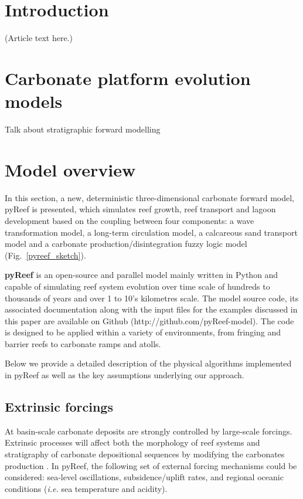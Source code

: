 \documentclass[default,jgrga]{agutex2015}
\begin{document}
\begin{article}

%
%

\section{Introduction}
(Article text here.)

\section{Carbonate platform evolution models}

Talk about stratigraphic forward modelling

\section{Model overview}

In this section, a new, deterministic three-dimensional carbonate forward model, pyReef is presented, which simulates reef growth, reef transport and lagoon development based on the coupling between four components: a wave transformation model, a long-term circulation model, a calcareous sand transport model and a carbonate production/disintegration fuzzy logic model (Fig.~\ref{pyreef_sketch}).

\noindent \textbf{pyReef} is an open-source and parallel model mainly written in Python and capable of simulating reef system evolution over time scale of hundreds to thousands of years and over 1 to 10's kilometres scale. The model source code, its associated documentation along with the input files for the examples discussed in this paper are available on Github (http://github.com/pyReef-model). The code is designed to be applied within a variety of environments, from fringing and barrier reefs to carbonate ramps and atolls.

\noindent Below we provide a detailed description of the physical algorithms implemented in pyReef as well as the key assumptions underlying our approach.

\subsection{Extrinsic forcings}

At basin-scale carbonate deposits are strongly controlled by large-scale forcings. Extrinsic processes will affect both the morphology of reef systems and stratigraphy of carbonate depositional sequences by modifying the carbonates production \citep{Hill06}. In pyReef, the following set of external forcing mechanisms could be considered: sea-level oscillations, subsidence/uplift rates, and regional oceanic conditions (\textit{i.e.} sea temperature and acidity).


\end{article}
\end{document}
